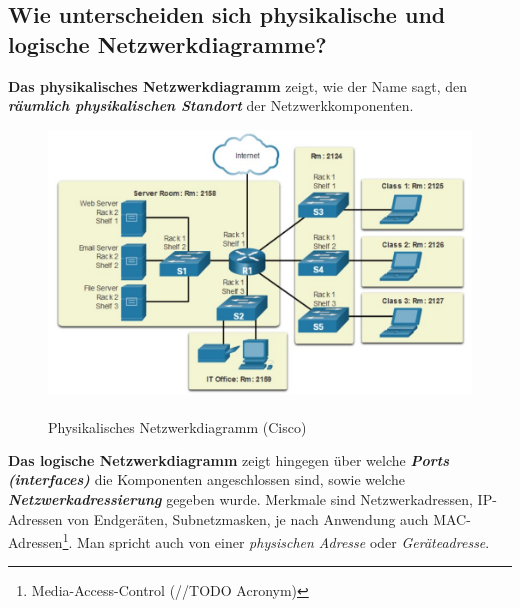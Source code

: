 \subsection*{Wie unterscheiden sich physikalische und logische Netzwerkdiagramme?}
\textbf{Das physikalisches Netzwerkdiagramm} zeigt, wie der Name sagt, den \textsl{\textbf{räumlich physikalischen Standort}} der Netzwerkkomponenten.
\begin{figure}[H]
    \begin{center}
    \label{pic:physical_topology}
    \includegraphics[width=\textwidth]{images/physical_topology_diagram.jpg}
    \caption{Physikalisches Netzwerkdiagramm (\textsuperscript{\textcopyright}Cisco)}
    \end{center}
\end{figure}
\textbf{Das logische Netzwerkdiagramm} zeigt hingegen über welche \textsl{\textbf{Ports (interfaces)}} die Komponenten angeschlossen sind, sowie welche \textsl{\textbf{Netzwerkadressierung}} gegeben wurde. Merkmale sind Netzwerkadressen, IP-Adressen von Endgeräten, Subnetzmasken, je nach Anwendung auch MAC-Adressen\footnote{Media-Access-Control (//TODO Acronym)}. Man spricht auch von einer \textsl{physischen Adresse} oder \textsl{Geräteadresse}.
